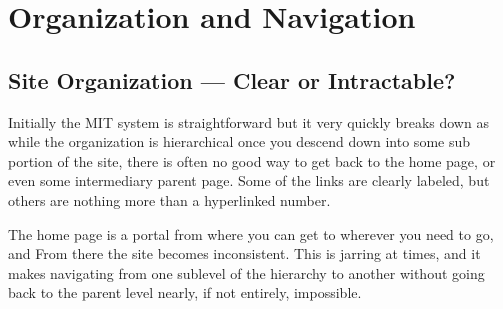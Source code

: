 \section*{Organization and Navigation}
\subsection*{Site Organization --- Clear or Intractable?}

Initially the MIT system is straightforward but it very quickly breaks down as while
the organization is hierarchical once you descend down into some sub portion of
the site, there is often no good way to get back to the home page, or even some
intermediary parent page. Some of the links are clearly labeled, but others are
nothing more than a hyperlinked number.

The home page is a portal from where you can get to wherever you need to go, and
From there the site becomes inconsistent. This is jarring at times, and it makes
navigating from one sublevel of the hierarchy to another without going back to the
parent level nearly, if not entirely, impossible.

\lipsum[1]
\lipsum[2]